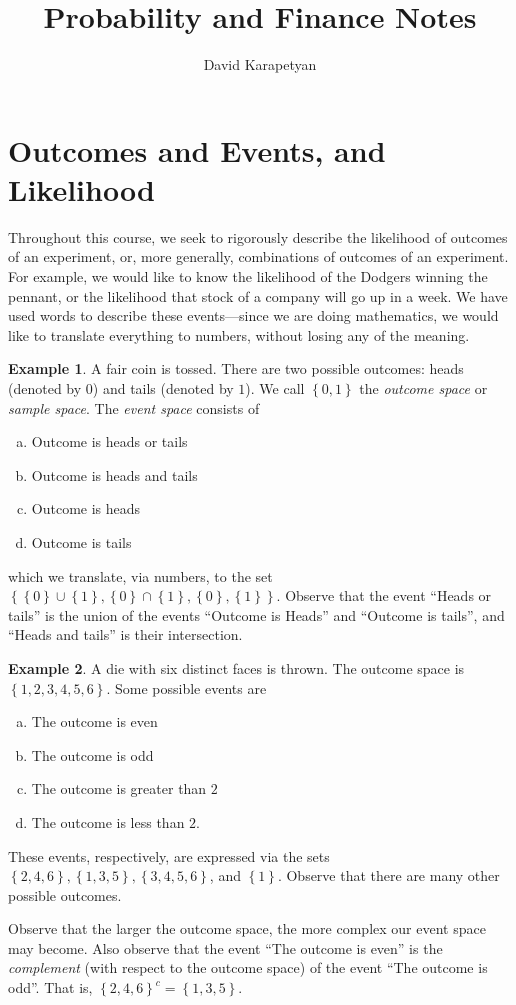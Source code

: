 \documentclass[12pt]{article}
\theoremstyle{plain}
\theoremstyle{definition}
\newtheorem*{example}{Example}
\theoremstyle{remark}
\numberwithin{equation}{section}  %
\begin{document}
\title{Probability and Finance Notes}
\author{David Karapetyan}
\date{}
\maketitle
\newpage
\setcounter{tocdepth}{2}
\setcounter{secnumdepth}{2}
\tableofcontents
\newpage
\section{Outcomes and Events, and Likelihood}
Throughout this course, we seek to rigorously describe the likelihood of
outcomes of an experiment, or, more generally, combinations of outcomes of an 
experiment.
For example, we would like to know the likelihood of the Dodgers
winning the pennant, or the likelihood that stock of a company will go up
in a week. We have used words to describe these events---since we are doing
mathematics, we would like to translate everything to numbers, without losing
any of the meaning.
\begin{example}
	A fair coin is tossed. There are two possible outcomes: heads (denoted by 
	$0$) 
	and tails (denoted by $1$). We call $ \left\{ 0,1 \right\} $ the 
	\emph{outcome
		space} or \emph{sample space}. The \emph{event space} consists of
	\begin{enumerate}[(a)]
		\item Outcome is heads or tails
		\item Outcome is heads and tails
		\item Outcome is heads
		\item Outcome is tails
	\end{enumerate}
	which we translate, via numbers, to the set $ \left\{ \left\{ 0 \right\} 
		\cup
		\left\{ 1 \right\}, \left\{ 0 \right\} \cap \left\{ 1 \right\} , \left\{ 0
		\right\} , \left\{ 1 \right\} \right \}$.
	Observe that the event ``Heads or tails'' is the union of the events
	``Outcome is Heads'' and ``Outcome is tails'', and ``Heads and tails'' is
	their intersection.
\end{example}	

\begin{example}
	A die with six distinct faces is thrown. The outcome space is
	$ \left\{ 1, 2, 3, 4, 5, 6 \right\} $. Some possible events are
	\begin{enumerate}[(a)]
		\item The outcome is even
		\item The outcome is odd
		\item The outcome is greater than $2$
		\item The outcome is less than $2$.
	\end{enumerate}
	These events, respectively, are expressed via the sets
	$ \left\{ 2, 4, 6 \right\} , \left\{ 1,3,5 \right\} , \left\{ 3, 4, 5, 6
	\right\}$, and $\left\{ 1 \right\}$.
	Observe that there are many other possible outcomes.
\end{example}
Observe that the larger the outcome space, the more complex
our event space may become. Also observe that the event
``The outcome is even'' is the \emph{complement} (with respect to the
outcome space) of
the event ``The outcome is odd''. That is,
${\left\{ 2,4,6 \right\}}^c
= \left\{ 1,3,5 \right\}$.
\end{document}

